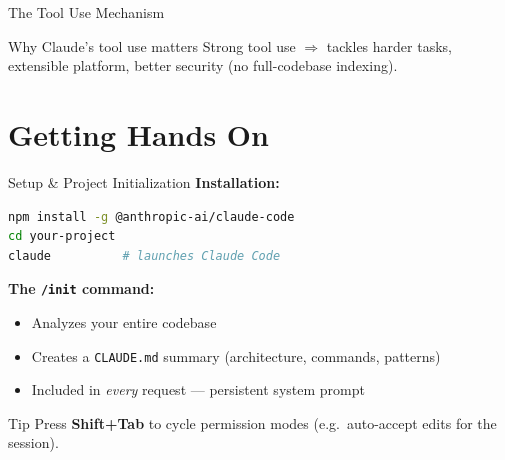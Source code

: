 \documentclass[aspectratio=169]{beamer}
\begin{document}
\begin{frame}{The Tool Use Mechanism}
\begin{center}
\end{center}

\bigskip
\begin{block}{Why Claude's tool use matters}
Strong tool use $\Rightarrow$ tackles harder tasks, extensible platform, better security (no full-codebase indexing).
\end{block}
\end{frame}

\section{Getting Hands On}

\begin{frame}[fragile]{Setup \& Project Initialization}
\textbf{Installation:}
\begin{lstlisting}[language=bash]
npm install -g @anthropic-ai/claude-code
cd your-project
claude          # launches Claude Code
\end{lstlisting}

\bigskip
\textbf{The \texttt{/init} command:}
\begin{itemize}
  \item Analyzes your entire codebase
  \item Creates a \texttt{CLAUDE.md} summary (architecture, commands, patterns)
  \item Included in \emph{every} request --- persistent system prompt
\end{itemize}

\bigskip
\begin{alertblock}{Tip}
Press \textbf{Shift+Tab} to cycle permission modes (e.g.\ auto-accept edits for the session).
\end{alertblock}
\end{frame}
\end{document}
